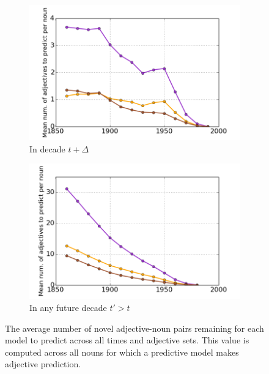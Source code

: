 \documentclass[output=paper]{langsci/langscibook}
\begin{document}
\begin{figure}
\begin{subfigure}[b]{.48\textwidth}
  \centering
  \includegraphics[width=.96\linewidth]{figures/GREWAL_number_of_pairs_to_predict.png}
  \caption{In decade $t + \Delta$}
\end{subfigure}\begin{subfigure}[b]{.48\textwidth}
  \centering
  \includegraphics[width=.96\linewidth]{figures/GREWAL_number_of_pairs_to_predict_future.png}
  \caption{In any future decade $t' > t$}
\end{subfigure}
\caption{The average number of novel adjective-noun pairs remaining for each model to predict across all times and adjective sets.
This value is computed across all nouns for which a predictive model makes adjective prediction.
\label{fig:number_of_new_pairs}}
\end{figure}
\clearpage

\largerpage
\end{document}
